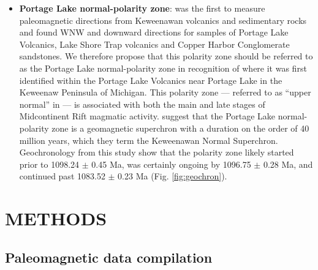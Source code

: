 \documentclass[11pt,letterpaper]{article}
\begin{document}
\begin{itemize}
\item \textbf{Portage Lake normal-polarity zone}: \cite{Dubois1955a} was the first to measure paleomagnetic directions from Keweenawan volcanics and sedimentary rocks and found WNW and downward directions for samples of Portage Lake Volcanics, Lake Shore Trap volcanics and Copper Harbor Conglomerate sandstones. We therefore propose that this polarity zone should be referred to as the Portage Lake normal-polarity zone in recognition of where it was first identified within the Portage Lake Volcanics near Portage Lake in the Keweenaw Peninsula of Michigan. This polarity zone --- referred to as ``upper normal'' in \cite{Swanson-Hysell2009a,Swanson-Hysell2014a} --- is associated with both the main and late stages of Midcontinent Rift magmatic activity. \cite{Driscoll2016a} suggest that the Portage Lake normal-polarity zone is a geomagnetic superchron with a duration on the order of 40 million years, which they term the Keweenawan Normal Superchron. Geochronology from this study show that the polarity zone likely started prior to 1098.24 $\pm$ 0.45 Ma, was certainly ongoing by 1096.75 $\pm$ 0.28 Ma, and continued past 1083.52 $\pm$ 0.23 Ma (Fig. \ref{fig:geochron}).
\end{itemize}

\section{METHODS}

\subsection{Paleomagnetic data compilation}
\end{document}
